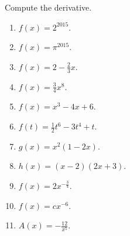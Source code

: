Compute the derivative.
\begin{multicols}{2}
\begin{enumerate}[ref={\fcProblemRef}]
\item $\displaystyle f(x)=2^{2015}$.

\item $\displaystyle f(x)=\pi^{2015}$.

\item $\displaystyle f(x)=2-\frac{2}{3}x$.

\item $\displaystyle f(x)=\frac{3}{4}x^8$.

\item $\displaystyle f(x)=x^3-4x+6$.

\item $\displaystyle f(t)=\frac{1}{2}t^6-3t^4+t$.

\item\label{problemDifferentiatexsquaredtimes1minus2x}$\displaystyle g(x)=x^2(1-2x)$. 

\item $\displaystyle h(x)=(x-2)(2x+3)$.

\item $\displaystyle f(x)=2x^{-\frac{3}{4}}$.

\item $\displaystyle f(x)=c x^{-6}$.

\item $\displaystyle A(x)=-\frac{12}{x^5}$.

\end{enumerate}
\end{multicols}
